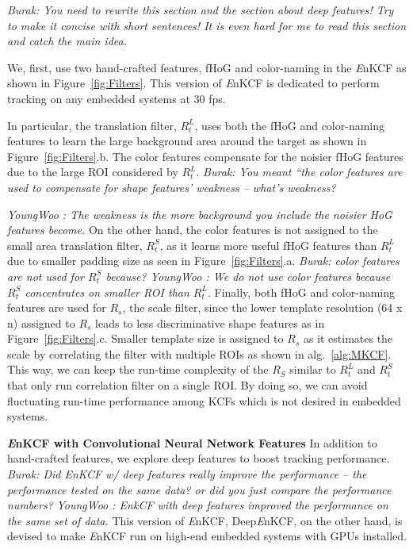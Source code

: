 \documentclass[10pt,twocolumn,letterpaper]{article}
\begin{document}
{\it Burak: You need to rewrite this section and the section about
  deep features! Try to make it concise with short sentences! It is
  even hard for me to read this section and catch the main idea.}

We, first, use two hand-crafted features, fHoG \cite{felzenszwalb2010object} 
and color-naming \cite{li2014scale} in the {\it E}nKCF as shown in Figure~\ref{fig:Filters}. 
This version of {\it E}nKCF is dedicated to perform tracking on any embedded systems at
$30$ fps.

In particular, the translation filter, $R_{t}^{L}$, uses
both the fHoG \cite{felzenszwalb2010object} and color-naming
\cite{van2009learning} features to learn the large background area
around the target as shown in Figure~\ref{fig:Filters}.b. The color features 
compensate for the noisier fHoG features due to the large ROI considered 
by $R_{t}^{L}$. {\it Burak: You meant ``the
  color features are used to compensate for shape features' weakness
  -- what's weakness?}
  
  {\it YoungWoo : The weakness is the more background you include the noisier
  HoG features become.}
On the other hand, the color features is not assigned to the small area translation 
filter,  $R_{t}^{S}$, as it learns more useful fHoG features than $R_{t}^{L}$ due to smaller
padding size as seen in Figure~\ref{fig:Filters}.a. {\it Burak: color features are not used for $R_{t}^{S}$ because?
\it YoungWoo : We do not use color features because  $R_{t}^{S}$ concentrates on smaller ROI
than  $R_{t}^{L}$}. Finally, both fHoG and color-naming features are used for $R_{s}$, the scale filter, 
since the lower template resolution (64 x n)
assigned to $R_{s}$ leads to less discriminative shape
features as in Figure~\ref{fig:Filters}.c. Smaller template size is assigned to $R_{s}$ as it estimates
the scale by correlating the filter with multiple ROIs as shown in
alg.~\ref{alg:MKCF}.  This way, we can keep the run-time complexity of
the $R_{S}$ similar to $R_{t}^{L}$ and $R_{t}^{S}$ that only run
correlation filter on a single ROI. By doing so, we can avoid
fluctuating run-time performance among KCFs which is not desired in embedded
systems.

\textbf{{\it E}nKCF with Convolutional Neural Network Features} In
addition to hand-crafted features, we explore deep features to boost
tracking performance. {\it Burak: Did EnKCF w/ deep features really
  improve the performance -- the performance tested on the same data?
  or did you just compare the performance numbers?}
  {\it YoungWoo : EnkCF with deep features improved the performance on the same set of data.}
This version of {\it E}nKCF, Deep{\it E}nKCF, on the other hand, is
devised to make {\it E}nKCF run on high-end embedded systems with GPUs
installed.
\end{document}
